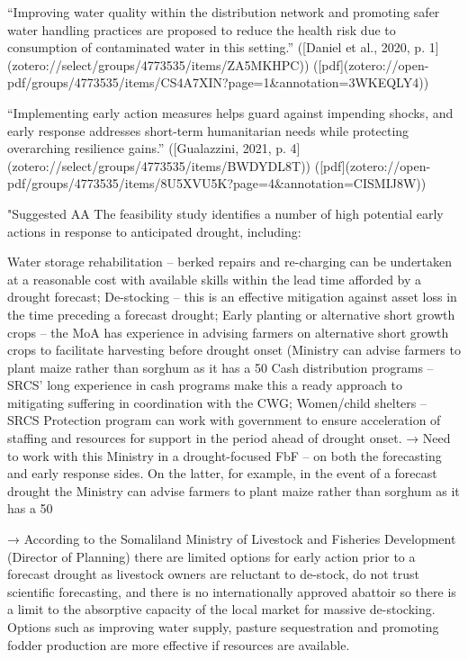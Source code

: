 {“Improving water quality within the distribution network and promoting safer water handling practices are proposed to reduce the health risk due to consumption of contaminated water in this setting.” ([Daniel et al., 2020, p. 1](zotero://select/groups/4773535/items/ZA5MKHPC)) ([pdf](zotero://open-pdf/groups/4773535/items/CS4A7XIN?page=1&annotation=3WKEQLY4))


“Implementing early action measures helps guard against impending shocks, and early response addresses short-term humanitarian needs while protecting overarching resilience gains.” ([Gualazzini, 2021, p. 4](zotero://select/groups/4773535/items/BWDYDL8T)) ([pdf](zotero://open-pdf/groups/4773535/items/8U5XVU5K?page=4&annotation=CISMIJ8W))








"Suggested AA
The feasibility study identifies a number of high potential early actions in response to anticipated drought, including:

Water storage rehabilitation – berked repairs and re-charging can be undertaken at a reasonable cost with available skills within the lead time afforded by a drought forecast;
De-stocking – this is an effective mitigation against asset loss in the time preceding a forecast drought;
Early planting or alternative short growth crops – the MoA has experience in advising farmers on alternative short growth crops to facilitate harvesting before drought onset (Ministry can advise farmers to plant maize rather than sorghum as it has a 50%
Cash distribution programs – SRCS’ long experience in cash programs make this a ready approach to mitigating suffering in coordination with the CWG;
Women/child shelters – SRCS Protection program can work with government to ensure acceleration of staffing and resources for support in the period ahead of drought onset.
→ Need to work with this Ministry in a drought-focused FbF – on both the forecasting and early response sides. On the latter, for example, in the event of a forecast drought the Ministry can advise farmers to plant maize rather than sorghum as it has a 50%

→ According to the Somaliland Ministry of Livestock and Fisheries Development (Director of Planning) there are limited options for early action prior to a forecast drought as livestock owners are reluctant to de-stock, do not trust scientific forecasting, and there is no internationally approved abattoir so there is a limit to the absorptive capacity of the local market for massive de-stocking. Options such as improving water supply, pasture sequestration and promoting fodder production are more effective if resources are available.

}
